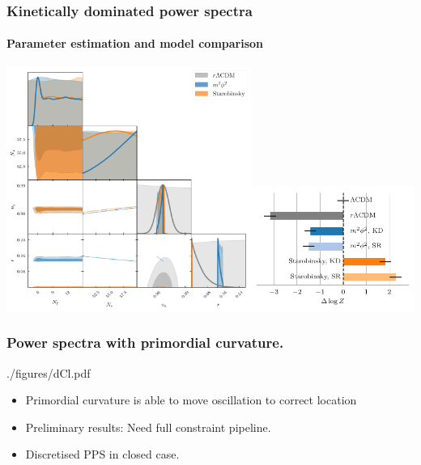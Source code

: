 \documentclass[%
]{beamer}
\begin{document}
\begin{frame}
    \frametitle{Kinetically dominated power spectra}
    \framesubtitle{Parameter estimation and model comparison}
    \includegraphics[width=0.6\textwidth]{./figures/cosmo_nrNN.pdf}\includegraphics[width=0.4\textwidth]{./figures/cosmo_evidences.pdf}
\end{frame}

\begin{frame}
    \frametitle{Power spectra with primordial curvature.}
    \begin{figright}[0.3]{./figures/dCl.pdf}
    \begin{itemize}
        \item Primordial curvature is able to move oscillation to correct location
        \item Preliminary results: Need full constraint pipeline.
        \item Discretised PPS in closed case.
    \end{itemize}
    \end{figright}
\end{frame}
\end{document}
